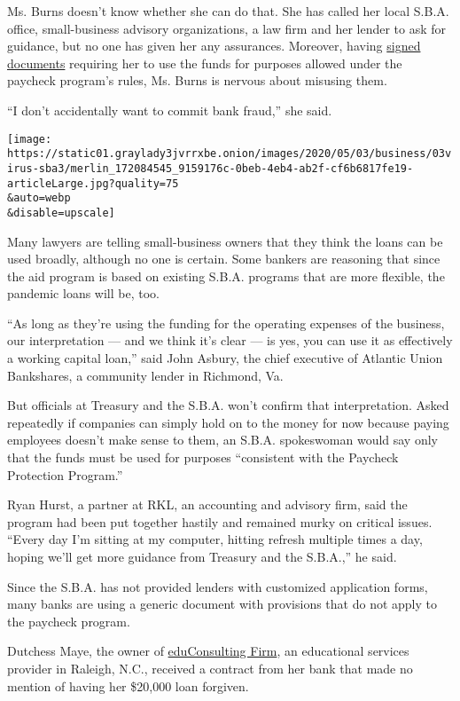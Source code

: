 Ms. Burns doesn't know whether she can do that. She has called her local
S.B.A. office, small-business advisory organizations, a law firm and her
lender to ask for guidance, but no one has given her any assurances.
Moreover, having
\href{https://home.treasury.gov/system/files/136/PPP-Borrower-Application-Form-Fillable.pdf}{signed
documents} requiring her to use the funds for purposes allowed under the
paycheck program's rules, Ms. Burns is nervous about misusing them.

``I don't accidentally want to commit bank fraud,'' she said.

\texttt{[image: https://static01.graylady3jvrrxbe.onion/images/2020/05/03/business/03virus-sba3/merlin\_172084545\_9159176c-0beb-4eb4-ab2f-cf6b6817fe19-articleLarge.jpg?quality=75\\\&auto=webp\\\&disable=upscale]}

Many lawyers are telling small-business owners that they think the loans
can be used broadly, although no one is certain. Some bankers are
reasoning that since the aid program is based on existing S.B.A.
programs that are more flexible, the pandemic loans will be, too.

``As long as they're using the funding for the operating expenses of the
business, our interpretation --- and we think it's clear --- is yes, you
can use it as effectively a working capital loan,'' said John Asbury,
the chief executive of Atlantic Union Bankshares, a community lender in
Richmond, Va.

But officials at Treasury and the S.B.A. won't confirm that
interpretation. Asked repeatedly if companies can simply hold on to the
money for now because paying employees doesn't make sense to them, an
S.B.A. spokeswoman would say only that the funds must be used for
purposes ``consistent with the Paycheck Protection Program.''

Ryan Hurst, a partner at RKL, an accounting and advisory firm, said the
program had been put together hastily and remained murky on critical
issues. ``Every day I'm sitting at my computer, hitting refresh multiple
times a day, hoping we'll get more guidance from Treasury and the
S.B.A.,'' he said.

Since the S.B.A. has not provided lenders with customized application
forms, many banks are using a generic document with provisions that do
not apply to the paycheck program.

Dutchess Maye, the owner of
\href{https://www.educonsultingfirm.com/}{eduConsulting Firm}, an
educational services provider in Raleigh, N.C., received a contract from
her bank that made no mention of having her \$20,000 loan forgiven.

